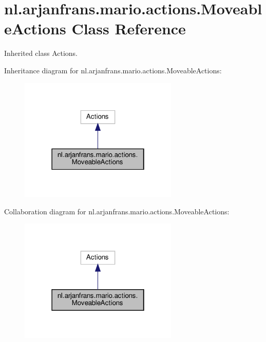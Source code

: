 \hypertarget{classnl_1_1arjanfrans_1_1mario_1_1actions_1_1MoveableActions}{}\section{nl.\+arjanfrans.\+mario.\+actions.\+Moveable\+Actions Class Reference}
\label{classnl_1_1arjanfrans_1_1mario_1_1actions_1_1MoveableActions}


Inherited class Actions.  




Inheritance diagram for nl.\+arjanfrans.\+mario.\+actions.\+Moveable\+Actions\+:\nopagebreak
\begin{figure}[H]
\begin{center}
\leavevmode
\includegraphics[width=214pt]{classnl_1_1arjanfrans_1_1mario_1_1actions_1_1MoveableActions__inherit__graph}
\end{center}
\end{figure}


Collaboration diagram for nl.\+arjanfrans.\+mario.\+actions.\+Moveable\+Actions\+:\nopagebreak
\begin{figure}[H]
\begin{center}
\leavevmode
\includegraphics[width=214pt]{classnl_1_1arjanfrans_1_1mario_1_1actions_1_1MoveableActions__coll__graph}
\end{center}
\end{figure}
